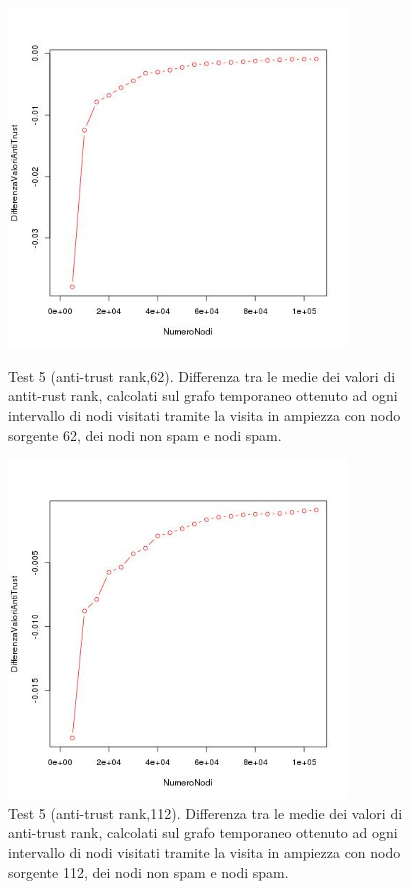 \begin{figure}
 \centering
 \includegraphics[height=9cm]{immagini/test5/averageTest_antitrust_62}
  \caption{Test 5 (anti-trust rank,62). Differenza tra le medie dei valori di antit-rust rank, calcolati sul grafo temporaneo ottenuto ad ogni intervallo di nodi visitati tramite la visita in ampiezza con nodo sorgente 62, dei nodi non spam e nodi spam.}
 \label{fig:test5antitrust62}
  \centering
 \includegraphics[height=9cm]{immagini/test5/averageTest_antitrust_112}
  \caption{Test 5 (anti-trust rank,112). Differenza tra le medie dei valori di anti-trust rank, calcolati sul grafo temporaneo ottenuto ad ogni intervallo di nodi visitati tramite la visita in ampiezza con nodo sorgente 112, dei nodi non spam e nodi spam.}
 \label{fig:test5antitrust112}
\end{figure}

